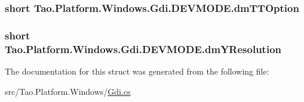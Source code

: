 \label{struct_tao_1_1_platform_1_1_windows_1_1_gdi_1_1_d_e_v_m_o_d_e_a6c71ec7028d086a9ee785f7775c4546b}
\hypertarget{struct_tao_1_1_platform_1_1_windows_1_1_gdi_1_1_d_e_v_m_o_d_e_aba3b2944fa385b6827ea16dfddb30623}{
\subsubsection[{dmTTOption}]{\setlength{\rightskip}{0pt plus 5cm}short {\bf Tao.Platform.Windows.Gdi.DEVMODE.dmTTOption}}}
\label{struct_tao_1_1_platform_1_1_windows_1_1_gdi_1_1_d_e_v_m_o_d_e_aba3b2944fa385b6827ea16dfddb30623}
\hypertarget{struct_tao_1_1_platform_1_1_windows_1_1_gdi_1_1_d_e_v_m_o_d_e_ada3dbcaf3c1e439ae77b6f66659bb13c}{
\subsubsection[{dmYResolution}]{\setlength{\rightskip}{0pt plus 5cm}short {\bf Tao.Platform.Windows.Gdi.DEVMODE.dmYResolution}}}
\label{struct_tao_1_1_platform_1_1_windows_1_1_gdi_1_1_d_e_v_m_o_d_e_ada3dbcaf3c1e439ae77b6f66659bb13c}


The documentation for this struct was generated from the following file:\begin{DoxyCompactItemize}
\item 
src/Tao.Platform.Windows/\hyperlink{_gdi_8cs}{Gdi.cs}\end{DoxyCompactItemize}
